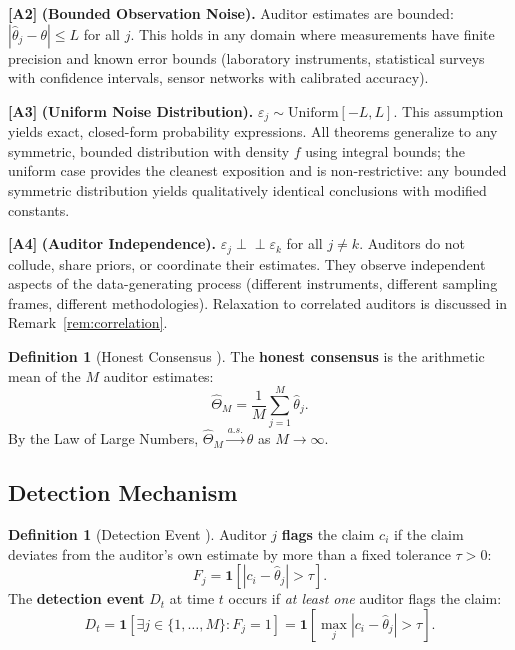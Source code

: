 \documentclass[11pt,a4paper]{article}
\theoremstyle{definition}
\newtheorem{definition}[theorem]{Definition}
\theoremstyle{remark}
\newcommand{\assumptionTag}[1]{\textsf{\textbf{[A#1]}}}
\newcommand{\ind}[1]{\mathbf{1}[#1]}
\newcommand{\abs}[1]{\left|#1\right|}
\newcommand{\claim}{c}
\newcommand{\truth}{\theta}
\newcommand{\threshold}{\tau}
\newcommand{\tol}{L}
\begin{document}
\assumptionTag{2} \textbf{(Bounded Observation Noise).} Auditor estimates are bounded: $\abs{\hat{\theta}_j - \truth} \leq \tol$ for all $j$. This holds in any domain where measurements have finite precision and known error bounds (laboratory instruments, statistical surveys with confidence intervals, sensor networks with calibrated accuracy).

\assumptionTag{3} \textbf{(Uniform Noise Distribution).} $\varepsilon_j \sim \text{Uniform}[-\tol, \tol]$. This assumption yields exact, closed-form probability expressions. All theorems generalize to any symmetric, bounded distribution with density $f$ using integral bounds; the uniform case provides the cleanest exposition and is non-restrictive: any bounded symmetric distribution yields qualitatively identical conclusions with modified constants.

\assumptionTag{4} \textbf{(Auditor Independence).} $\varepsilon_j \perp\!\!\!\perp \varepsilon_k$ for all $j \neq k$. Auditors do not collude, share priors, or coordinate their estimates. They observe independent aspects of the data-generating process (different instruments, different sampling frames, different methodologies). Relaxation to correlated auditors is discussed in Remark~\ref{rem:correlation}.

\begin{definition}[Honest Consensus ]
\label{def:consensus}
The \textbf{honest consensus} is the arithmetic mean of the $M$ auditor estimates:
\begin{equation}
    \hat{\Theta}_M = \frac{1}{M} \sum_{j=1}^{M} \hat{\theta}_j.
\end{equation}
By the Law of Large Numbers, $\hat{\Theta}_M \xrightarrow{a.s.} \truth$ as $M \to \infty$.
\end{definition}

\subsection{Detection Mechanism }

\begin{definition}[Detection Event ]
\label{def:detection}
Auditor $j$ \textbf{flags} the claim $\claim_i$ if the claim deviates from the auditor's own estimate by more than a fixed tolerance $\threshold > 0$:
\begin{equation}
    F_j = \ind{\abs{\claim_i - \hat{\theta}_j} > \threshold}.
\end{equation}
The \textbf{detection event} $D_t$ at time $t$ occurs if \emph{at least one} auditor flags the claim:
\begin{equation}
    D_t = \ind{\exists j \in \{1,\dots,M\} : F_j = 1} = \ind{\max_j \abs{\claim_i - \hat{\theta}_j} > \threshold}.
\end{equation}
\end{definition}
\end{document}
